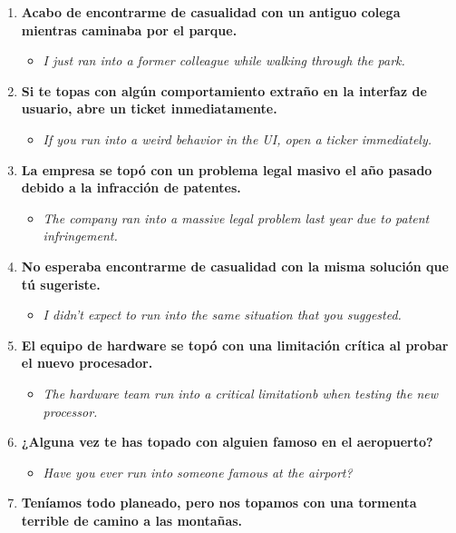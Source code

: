 \documentclass[
10pt, %
a4paper, %
oneside, %
headinclude,footinclude, %
BCOR5mm, %
]{scrartcl}
\begin{document}
\begin{enumerate}
\begin{itemize}
		\item \textit{I hope I don't run into my boss in the ahllway, because I forgot to send the report.}
	\end{itemize}
	\item \textbf{Acabo de encontrarme de casualidad con un antiguo colega mientras caminaba por el parque.}
	\begin{itemize}
		\item \textit{I just ran into a former colleague while walking through the park.}
	\end{itemize}
	\item \textbf{Si te topas con algún comportamiento extraño en la interfaz de usuario, abre un ticket inmediatamente.}
	\begin{itemize}
		\item \textit{If you run into a weird behavior in the UI, open a ticker immediately.}
	\end{itemize}
	\item \textbf{La empresa se topó con un problema legal masivo el año pasado debido a la infracción de patentes.}
	\begin{itemize}
		\item \textit{The company ran into a massive legal problem last year due to patent infringement.}
	\end{itemize}
	\item \textbf{No esperaba encontrarme de casualidad con la misma solución que tú sugeriste.}
	\begin{itemize}
		\item \textit{I didn't expect to run into the same situation that you suggested.}
	\end{itemize}
	\item \textbf{El equipo de hardware se topó con una limitación crítica al probar el nuevo procesador.}
	\begin{itemize}
		\item \textit{The hardware team run into a critical limitationb when testing the new processor.}
	\end{itemize}
	\item \textbf{¿Alguna vez te has topado con alguien famoso en el aeropuerto?}
	\begin{itemize}
		\item \textit{Have you ever run into someone famous at the airport?}
	\end{itemize}
	\item \textbf{Teníamos todo planeado, pero nos topamos con una tormenta terrible de camino a las montañas.}

\end{enumerate}
\end{document}
